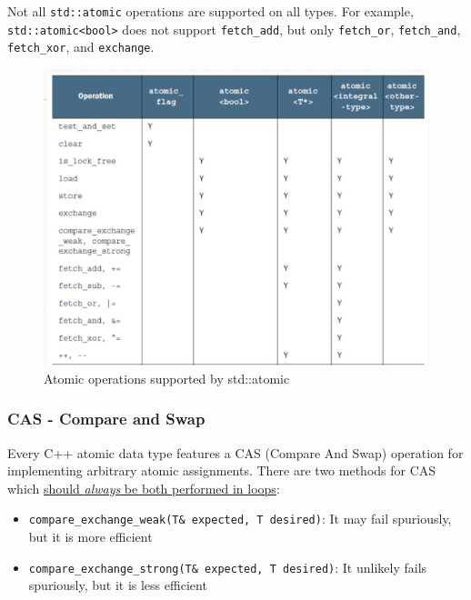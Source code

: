 \begin{paracol}{2}
   
   Not all \lstinline|std::atomic| operations are supported on all types. For example, \lstinline|std::atomic<bool>| does not support \lstinline|fetch_add|, but only \lstinline|fetch_or|, \lstinline|fetch_and|, \lstinline|fetch_xor|, and \lstinline|exchange|.
   
   \switchcolumn

   \begin{figure}[htbp]
      \centering
      \includegraphics{images/08/atomic_ops.png}
      \caption{Atomic operations supported by std::atomic}
      \label{fig:08/atomic_ops}
   \end{figure}
\end{paracol}

\subsubsection{CAS - Compare and Swap}
Every C++ atomic data type features a CAS (Compare And Swap) operation for implementing arbitrary atomic assignments.
There are two methods for CAS which \ul{should \textit{always} be both performed in loops}:
\begin{itemize}
   \item \lstinline|compare_exchange_weak(T& expected, T desired)|: It may fail spuriously, but it is more efficient
   \item \lstinline|compare_exchange_strong(T& expected, T desired)|: It unlikely fails spuriously, but it is less efficient
\end{itemize}


